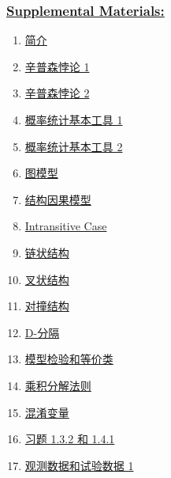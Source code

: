 \documentclass[11pt]{article}
\begin{document}
\subsubsection*{\href{https://space.bilibili.com/491707363/lists/25679?type=season}{Supplemental Materials:}}


\begin{multicols}{3}
	\begin{enumerate}
		\item \href{https://mp.weixin.qq.com/s/qroVyHDwNjOEkoLWPTFDwg}{\small 简介}	%
		\item \href{https://mp.weixin.qq.com/s/d4PVqAFXsdeMN-ZWz5aATA}{\small 辛普森悖论 1}	%
		\item \href{https://mp.weixin.qq.com/s/BbGhJG6zVFxo_xPRUMuE9A}{\small 辛普森悖论 2}	%
		\item \href{https://mp.weixin.qq.com/s/nbCWMl-eaTzCjYqGrHSjSA}{\small 概率统计基本工具 1}	%
		\item \href{https://mp.weixin.qq.com/s/_OALIAraHh1kLxz4WM4SDQ}{\small 概率统计基本工具 2}	%
		\item \href{https://mp.weixin.qq.com/s/dJcCR8LJlUKa80lmB8M8eg}{\small 图模型}	%
		\item \href{https://mp.weixin.qq.com/s/ioHaB_aSR5hzQuqjZB_VZQ}{\small 结构因果模型}	%
		\item \href{https://mp.weixin.qq.com/s/D55qKD7w5yLKTjP7_S3wug}{\small Intransitive Case}	%
		\item \href{https://mp.weixin.qq.com/s/oacDo6ydqp6YERJC-_bQ0Q}{\small 链状结构}	%
		\item \href{https://mp.weixin.qq.com/s/tTwGhY6cnCWgsM9StlBj0A}{\small 叉状结构}	%
		\item \href{https://mp.weixin.qq.com/s/6Uw-RI8G5pmvH71kER392A}{\small 对撞结构}	%
		\item \href{https://mp.weixin.qq.com/s/Q2Um2f-cy_D5s6nEhtFUUA}{\small D-分隔}	%
		\item \href{https://mp.weixin.qq.com/s/f_DPek3v2I7h2JfsXheCRw}{\small 模型检验和等价类}	%
		\item \href{https://mp.weixin.qq.com/s/Uf2Gvs7y9u7A8STtQQHeCg}{\small 乘积分解法则}	%
		\item \href{https://mp.weixin.qq.com/s/mvpAu4WOkg6PULIncn8MmA}{\small 混淆变量}	%
		\item \href{https://mp.weixin.qq.com/s/EybWLdgnl4cAGdHCFHihUg}{\small 习题 1.3.2 和 1.4.1}	%
		\item \href{https://mp.weixin.qq.com/s/8mBCmaYlAdL-AMISakK3kw}{\small 观测数据和试验数据 1}	%

\end{enumerate}
\end{multicols}
\end{document}
